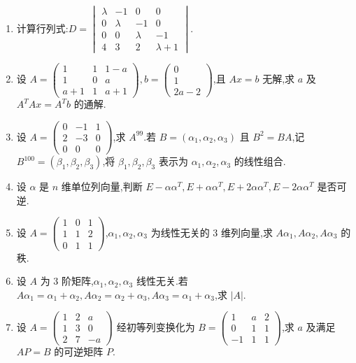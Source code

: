 \begin{enumerate}
	\item 计算行列式:$D = \begin{vmatrix} \lambda & -1 & 0 & 0 \\ 0 & \lambda & -1 & 0 \\ 0 & 0 & \lambda & -1 \\ 4 & 3 & 2 & \lambda + 1 \end{vmatrix}$.
	
	\item 设 $A = \begin{pmatrix} 1 & 1 & 1-a \\ 1 & 0 & a \\ a+1 & 1 & a+1 \end{pmatrix}, b = \begin{pmatrix} 0 \\ 1 \\ 2a-2 \end{pmatrix}$,且 $Ax=b$ 无解,求 $a$ 及 $A^T Ax = A^T b$ 的通解.
	
	\item 设 $A = \begin{pmatrix} 0 & -1 & 1 \\ 2 & -3 & 0 \\ 0 & 0 & 0 \end{pmatrix}$,求 $A^{99}$.若 $B = (\alpha_1, \alpha_2, \alpha_3)$ 且 $B^2 = BA$,记 $B^{100} = (\beta_1, \beta_2, \beta_3)$,将 $\beta_1, \beta_2, \beta_3$ 表示为 $\alpha_1, \alpha_2, \alpha_3$ 的线性组合.
	
	\item 设 $\alpha$ 是 $n$ 维单位列向量,判断 $E - \alpha\alpha^T, E + \alpha\alpha^T, E + 2\alpha\alpha^T, E - 2\alpha\alpha^T$ 是否可逆.
	
	\item 设 $A = \begin{pmatrix} 1 & 0 & 1 \\ 1 & 1 & 2 \\ 0 & 1 & 1 \end{pmatrix}$,$\alpha_1, \alpha_2, \alpha_3$ 为线性无关的 3 维列向量,求 $A\alpha_1, A\alpha_2, A\alpha_3$ 的秩.
	
	\item 设 $A$ 为 3 阶矩阵,$\alpha_1, \alpha_2, \alpha_3$ 线性无关.若 $A\alpha_1 = \alpha_1 + \alpha_2, A\alpha_2 = \alpha_2 + \alpha_3, A\alpha_3 = \alpha_1 + \alpha_3$,求 $|A|$.
	
	\item 设 $A = \begin{pmatrix} 1 & 2 & a \\ 1 & 3 & 0 \\ 2 & 7 & -a \end{pmatrix}$ 经初等列变换化为 $B = \begin{pmatrix} 1 & a & 2 \\ 0 & 1 & 1 \\ -1 & 1 & 1 \end{pmatrix}$,求 $a$ 及满足 $AP=B$ 的可逆矩阵 $P$.
	

\end{enumerate}
